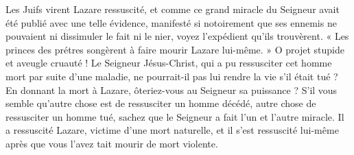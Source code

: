 Les Juifs virent Lazare ressuscité, et comme ce grand miracle du Seigneur avait été publié avec une telle évidence, manifesté si notoirement que ses ennemis ne pouvaient ni dissimuler le fait ni le nier, voyez l’expédient qu’ils trouvèrent. « Les princes des prétres songèrent à faire mourir Lazare lui-même. » O projet stupide et aveugle cruauté ! Le Seigneur Jésus-Christ, qui a pu ressusciter cet homme mort par suite d’une maladie, ne pourrait-il pas lui rendre la vie s’il était tué ? En donnant la mort à Lazare, ôteriez-vous au Seigneur sa puissance ? S’il vous semble qu’autre chose est de ressusciter un homme décédé, autre chose de ressusciter un homme tué, sachez que le Seigneur a fait l’un et l’autre miracle. Il a ressuscité Lazare, victime d’une mort naturelle, et il s’est ressuscité lui-même après que vous l’avez tait mourir de mort violente.